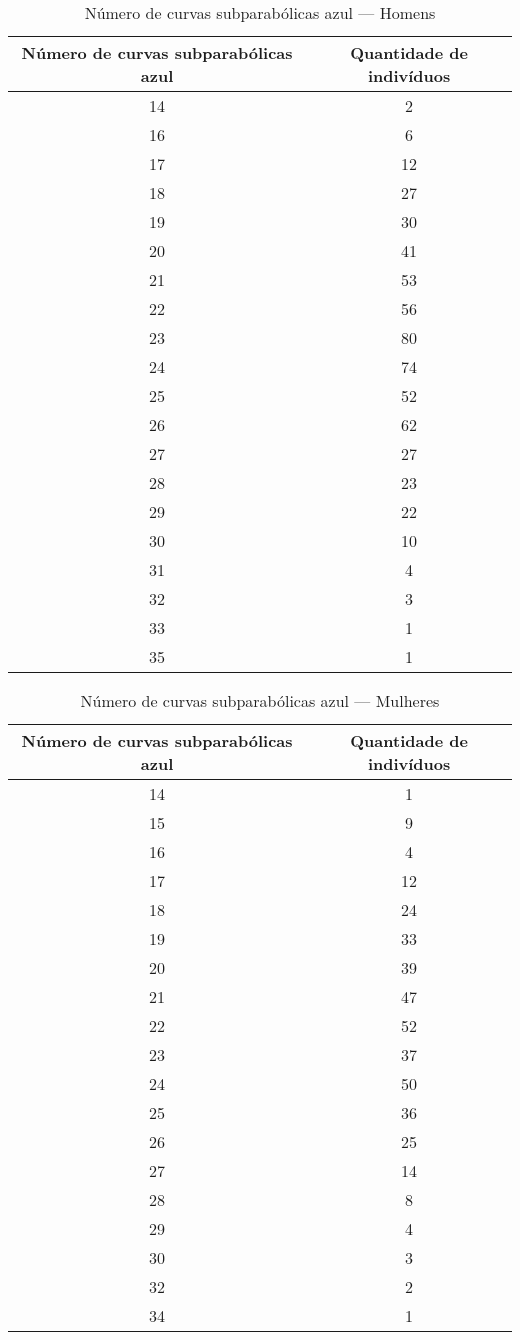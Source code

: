 \documentclass[a4paper,12pt]{article}
\begin{document}
\begin{table}[h!]
\centering
\caption{Número de curvas subparabólicas azul — Homens}
\begin{tabular}{c c}
\hline
\textbf{Número de curvas subparabólicas azul} & \textbf{Quantidade de indivíduos} \\ 
\hline
14 & 2  \\
16 & 6  \\
17 & 12 \\
18 & 27 \\
19 & 30 \\
20 & 41 \\
21 & 53 \\
22 & 56 \\
23 & 80 \\
24 & 74 \\
25 & 52 \\
26 & 62 \\
27 & 27 \\
28 & 23 \\
29 & 22 \\
30 & 10 \\
31 & 4  \\
32 & 3  \\
33 & 1  \\
35 & 1  \\
\hline
\end{tabular}
\end{table}


\begin{table}[h!]
\centering
\caption{Número de curvas subparabólicas azul — Mulheres}
\begin{tabular}{c c}
\hline
\textbf{Número de curvas subparabólicas azul} & \textbf{Quantidade de indivíduos} \\ 
\hline
14 & 1  \\
15 & 9  \\
16 & 4  \\
17 & 12 \\
18 & 24 \\
19 & 33 \\
20 & 39 \\
21 & 47 \\
22 & 52 \\
23 & 37 \\
24 & 50 \\
25 & 36 \\
26 & 25 \\
27 & 14 \\
28 & 8  \\
29 & 4  \\
30 & 3  \\
32 & 2  \\
34 & 1  \\
\hline
\end{tabular}
\end{table}
\end{document}

